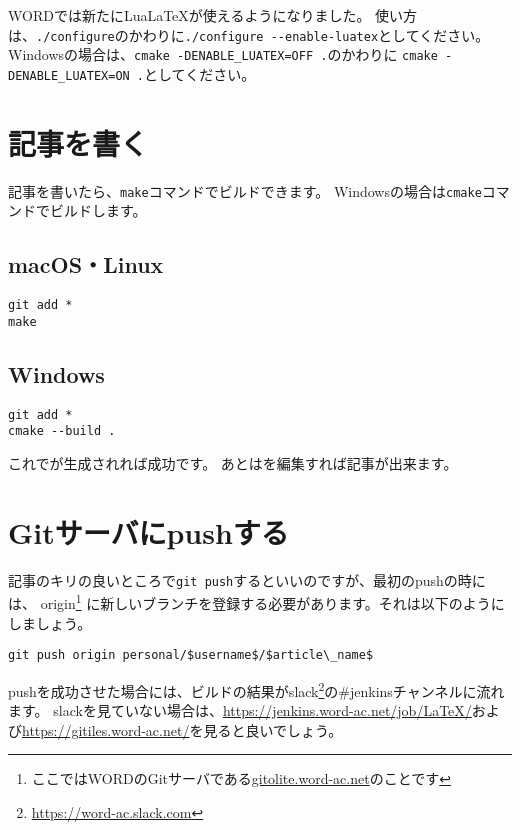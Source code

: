 WORDでは新たにLua\LaTeX が使えるようになりました。
使い方は、\lstinline|./configure|のかわりに\lstinline|./configure --enable-luatex|としてください。
Windowsの場合は、\lstinline|cmake -DENABLE_LUATEX=OFF .|のかわりに
\lstinline|cmake -DENABLE_LUATEX=ON .|としてください。

\section{記事を書く}

記事を書いたら、\lstinline|make|コマンドでビルドできます。
Windowsの場合は\lstinline|cmake|コマンドでビルドします。

\subsection{macOS・Linux}

\begin{lstlisting}
git add *
make
\end{lstlisting}

\subsection{Windows}

\begin{lstlisting}
git add *
cmake --build .
\end{lstlisting}

これでが生成されれば成功です。
あとはを編集すれば記事が出来ます。

\section{Gitサーバにpushする}

記事のキリの良いところで\lstinline|git push|するといいのですが、最初のpushの時には、
origin\footnote{ここではWORDのGitサーバである\url{gitolite.word-ac.net}のことです}%
に新しいブランチを登録する必要があります。それは以下のようにしましょう。

\begin{lstlisting}[mathescape]
git push origin personal/$username$/$article\_name$
\end{lstlisting}

pushを成功させた場合には、ビルドの結果がslack\footnote{\url{https://word-ac.slack.com}}の\#jenkinsチャンネルに流れます。
slackを見ていない場合は、\url{https://jenkins.word-ac.net/job/LaTeX/}および\url{https://gitiles.word-ac.net/}を見ると良いでしょう。


